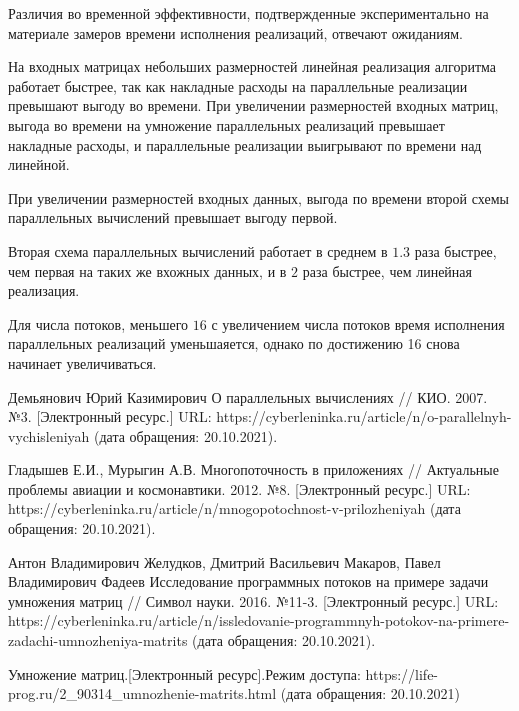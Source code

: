 \documentclass[12pt]{report}
\begin{document}
Различия во временной эффективности, подтвержденные экспериментально на материале замеров времени исполнения реализаций, отвечают ожиданиям. 

На входных матрицах небольших размерностей линейная реализация алгоритма работает быстрее, так как накладные расходы на параллельные реализации превышают выгоду во времени. При увеличении размерностей входных матриц, выгода во времени на умножение параллельных реализаций превышает накладные расходы, и параллельные реализации выигрывают по времени над линейной.

При увеличении размерностей входных данных, выгода по времени второй схемы параллельных вычислений превышает выгоду первой. 

Вторая схема параллельных вычислений работает в среднем в $1.3$ раза быстрее, чем первая на таких же вхожных данных, и в $2$ раза быстрее, чем линейная реализация.

Для числа потоков, меньшего $16$ с увеличением числа потоков время исполнения параллельных реализаций уменьшаяется, однако по достижению 16 снова начинает увеличиваться.




\begin{thebibliography}{9}
		
		Демьянович Юрий Казимирович О параллельных вычислениях // КИО. 2007. №3. [Электронный ресурс.] URL: https://cyberleninka.ru/article/n/o-parallelnyh-vychisleniyah (дата обращения: 20.10.2021).
		
		Гладышев Е.И., Мурыгин А.В. Многопоточность в приложениях // Актуальные проблемы авиации и космонавтики. 2012. №8. [Электронный ресурс.] URL: https://cyberleninka.ru/article/n/mnogopotochnost-v-prilozheniyah (дата обращения: 20.10.2021).
		
		Антон Владимирович Желудков, Дмитрий Васильевич Макаров, Павел Владимирович Фадеев Исследование программных потоков на примере задачи умножения матриц // Символ науки. 2016. №11-3. [Электронный ресурс.] URL: https://cyberleninka.ru/article/n/issledovanie-programmnyh-potokov-na-primere-zadachi-umnozheniya-matrits (дата обращения: 20.10.2021).
		
		  Умножение матриц.[Электронный ресурс].Режим доступа: https://life-prog.ru/2\_90314\_umnozhenie-matrits.html (дата обращения: 20.10.2021)
\end{thebibliography}
\end{document}

